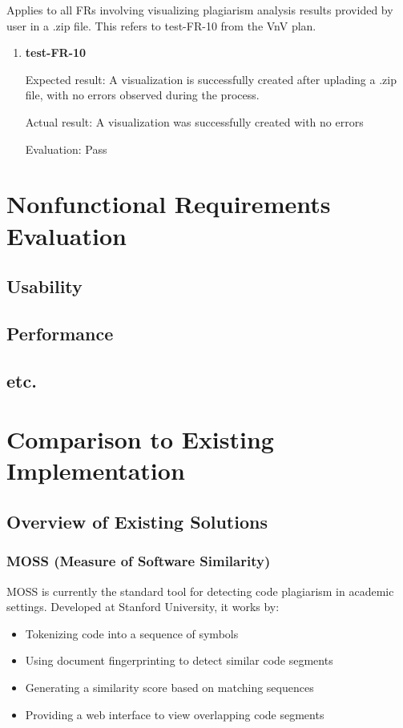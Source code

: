 \documentclass[12pt, titlepage]{article}
\begin{document}
Applies to all FRs involving visualizing plagiarism analysis results provided 
by user in a .zip file. This refers to test-FR-10 from the VnV plan.


\begin{enumerate}

\item{\textbf{test-FR-10}}
			
Expected result: A visualization is successfully created after uplading a .zip
file, with no errors observed during the process.

Actual result: A visualization was successfully created with no errors

Evaluation: Pass

\end{enumerate}



\section{Nonfunctional Requirements Evaluation}

\subsection{Usability}
		
\subsection{Performance}

\subsection{etc.}
	
\section{Comparison to Existing Implementation}	

\subsection{Overview of Existing Solutions}

\subsubsection{MOSS (Measure of Software Similarity)}
MOSS is currently the standard tool for detecting code plagiarism in academic settings. Developed at Stanford University, it works by:
\begin{itemize}
    \item Tokenizing code into a sequence of symbols
    \item Using document fingerprinting to detect similar code segments
    \item Generating a similarity score based on matching sequences
    \item Providing a web interface to view overlapping code segments
\end{itemize}
\end{document}
